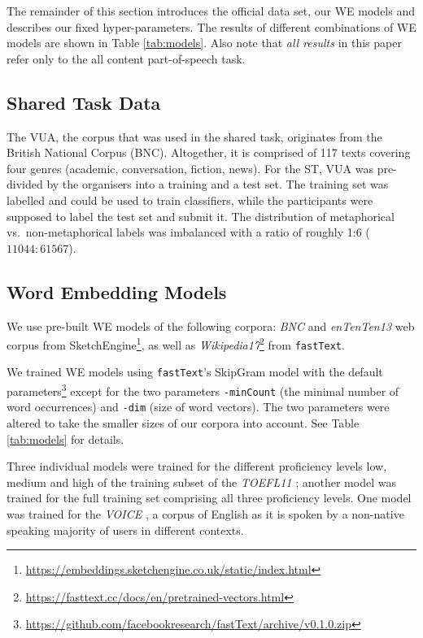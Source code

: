 \documentclass[11pt,a4paper]{article}
\newcommand\fT{\texttt{fastText}\xspace}
\begin{document}
The remainder of this section introduces the official data set, our WE models and describes our fixed hyper-parameters.
The results of different combinations of WE models are shown in Table \ref{tab:models}. 
Also note that \emph{all results} in this paper refer only to the all content part-of-speech task.


\subsection{Shared Task Data} %

The VUA, the corpus that was used in the shared task, originates from the British National Corpus (BNC). 
Altogether, it is comprised of 117 texts covering four genres (academic, conversation, fiction, news).
For the ST, VUA was pre-divided by the organisers into a training and a test set.
The training set was labelled and could be used to train classifiers, while the participants were supposed to label the test set and submit it.
The distribution of metaphorical vs.~non-metaphorical labels was imbalanced with a ratio of roughly 1:6 ($11044:61567$).


\subsection{Word Embedding Models}  %
\label{sec:wemodels}

We use pre-built WE models of the following corpora: \emph{BNC} and \emph{enTenTen13} web corpus \cite{1120431} from SketchEngine\footnote{\url{https://embeddings.sketchengine.co.uk/static/index.html}}, as well as \emph{Wikipedia17}\footnote{\url{https://fasttext.cc/docs/en/pretrained-vectors.html}} from \fT \cite{DBLP:journals/corr/BojanowskiGJM16}. 

We trained WE models using \fT's SkipGram model with the default parameters\footnote{\url{https://github.com/facebookresearch/fastText/archive/v0.1.0.zip}} except for the two parameters \texttt{-minCount} (the minimal number of word occurrences) and \texttt{-dim} (size of word vectors). 
The two parameters were altered to take the smaller sizes of our corpora into account. See Table \ref{tab:models} for details.

Three individual models were trained for the different proficiency levels low, medium and high of the training subset of the \emph{TOEFL11} \cite{ETS2:ETS202331}; another model was trained for the full training set comprising all three proficiency levels. One model was trained for the \emph{VOICE} \cite{Seidlhofer2013}, a corpus of English as it is spoken by a non-native speaking majority of users in different contexts.
\end{document}
